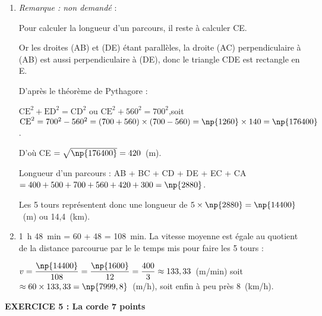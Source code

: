 \documentclass[10pt]{article}
\begin{document}

%

\begin{enumerate}[resume]
\item %
\emph{Remarque : non demandé} : 

Pour calculer la longueur d'un parcours, il reste à calculer CE.

Or les droites (AB) et (DE) étant parallèles, la droite (AC) perpendiculaire à (AB) est aussi perpendiculaire à (DE), donc le triangle CDE est rectangle en E.

D'après le théorème de Pythagore :

$\text{CE}^2 + \text{ED}^2 = \text{CD}^2$ ou $\text{CE}^2 + 560^2 = 700^2$,soit $\text{CE}^2 = 700^2 - 560^2 = (700+560)\times (700-560) = \np{1260} \times 140 = \np{176400} $.

D'où CE $= \sqrt{\np{176400}} = 420$~(m).

Longueur d'un parcours : AB + BC + CD + DE + EC + CA $= 400 + 500 + 700 + 560 + 420 + 300 = \np{2880}$.

Les 5 tours représentent donc une longueur de $5 \times \np{2880} = \np{14400}$~(m) ou 14,4~(km).
\item %
1~h 48~min = 60 + 48 = 108~min.
La vitesse moyenne est égale au quotient de la distance parcourue par le le temps mis pour faire les 5 tours :

$v = \dfrac{\np{14400}}{108}= \dfrac{\np{1600}}{12}= \dfrac{400}{3} \approx 133,33$~(m/min) soit $\approx 60 \times 133,33 = \np{7999,8}$~(m/h), soit enfin à peu près 8~(km/h).
\end{enumerate}

\vspace{0,5cm}

\textbf{EXERCICE 5 : La corde \hfill 7 points}

\medskip

\end{document}
